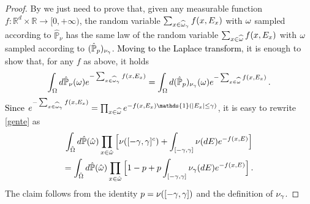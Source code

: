 \documentclass[12pt,a4paper,reqno]{amsart}
\newcommand{\bbP}{{\ensuremath{\mathbb P}} }
\newcommand{\bbR}{{\ensuremath{\mathbb R}} }
\let\O=\Omega \let\P=\Pi   \let\Ps=\Psi \let\Si=\Sigma \let\X=\Xi
\newcommand{\rosso}{\textcolor{black}} %
\newcommand{\be}{\begin{equation}}
\newcommand{\en}{\end{equation}}
\begin{document}
\begin{proof} 
By  \cite[Lemma~12.1]{Kal} we just need to prove that, 
given  any measurable function $f: \bbR^d\times\bbR\to [0,+\infty)$,  the random variable $\sum_{x\in \widehat{\omega}_\gamma }f(x, E_x)$ with $\omega$ sampled according to $\hat \bbP_\nu$ has the same law of the random variable $\sum_{x\in \widehat{\omega} }f(x, E_x)$ with 
 $\omega$ sampled according to $(\hat \bbP_p)_{\nu_\g}$.  \rosso{Moving to the Laplace transform}, it is enough to show that,  for any $f$ as above, it holds %
% 
% 
 \be\label{gente} \int_\O d \hat \bbP_\nu(\o)
 e^{- \sum_{x\in \widehat \o_\g} f(x,E_x)}  =\int _\O d (\hat \bbP_p)_{\nu_\g} (\o) e^{-\sum_{x\in \widehat \o} f(x,E_x)} \,.
 \en
\rosso{ Since $e^{- \sum_{x\in \widehat \o_\g} f(x,E_x)}=\prod_{x\in \widehat \o} e^{- f(x,E_x) \mathds{1}( |E_x| \leq \g )  }$}, it is easy to rewrite \eqref{gente}  as \begin{multline*}
\int _{\hat \O} d \hat \bbP(\hat \o) \prod_{x\in \hat \o} \Big[ \nu( [ -\g, \g]^c)+\int_{[-\g, \g]} \nu( dE)  e^{- f(x,E) }\Big]\\ = \int _{\hat \O} d \hat \bbP(\hat \o) \prod_{x\in \hat \o}     \Big[ 1-p+ p\int_{[-\g, \g]} \nu_\g ( dE)  e^{- f(x,E) }   \Big]  \,.
\end{multline*}
The claim follows from the identity  $p=\nu([-\gamma,\gamma])$ and the definition of $\nu_\gamma$.
%

\end{proof}
\end{document}
